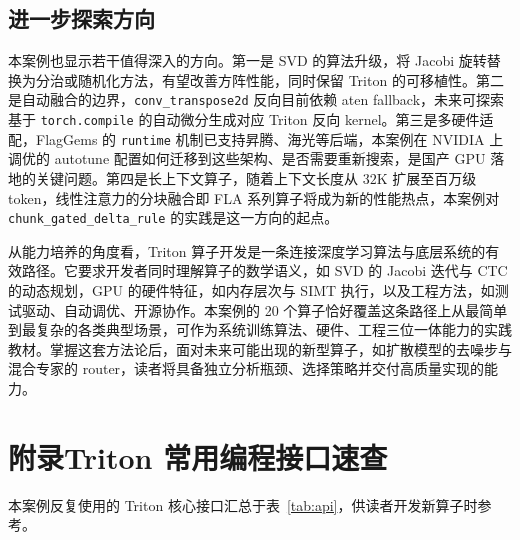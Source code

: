 \subsection{进一步探索方向}
本案例也显示若干值得深入的方向。第一是 SVD 的算法升级，将 Jacobi 旋转替换为分治或随机化方法，有望改善方阵性能，同时保留 Triton 的可移植性。第二是自动融合的边界，\texttt{conv\_transpose2d} 反向目前依赖 aten fallback，未来可探索基于 \texttt{torch.compile} 的自动微分生成对应 Triton 反向 kernel。第三是多硬件适配，FlagGems 的 \texttt{runtime} 机制已支持昇腾、海光等后端，本案例在 NVIDIA 上调优的 autotune 配置如何迁移到这些架构、是否需要重新搜索，是国产 GPU 落地的关键问题。第四是长上下文算子，随着上下文长度从 $32$K 扩展至百万级 token，线性注意力的分块融合即 FLA 系列算子将成为新的性能热点，本案例对 \texttt{chunk\_gated\_delta\_rule} 的实践是这一方向的起点。

从能力培养的角度看，Triton 算子开发是一条连接深度学习算法与底层系统的有效路径。它要求开发者同时理解算子的数学语义，如 SVD 的 Jacobi 迭代与 CTC 的动态规划，GPU 的硬件特征，如内存层次与 SIMT 执行，以及工程方法，如测试驱动、自动调优、开源协作。本案例的 20 个算子恰好覆盖这条路径上从最简单到最复杂的各类典型场景，可作为系统训练算法、硬件、工程三位一体能力的实践教材。掌握这套方法论后，面对未来可能出现的新型算子，如扩散模型的去噪步与混合专家的 router，读者将具备独立分析瓶颈、选择策略并交付高质量实现的能力。

\section*{附录\quad Triton 常用编程接口速查}
本案例反复使用的 Triton 核心接口汇总于表~\ref{tab:api}，供读者开发新算子时参考。

